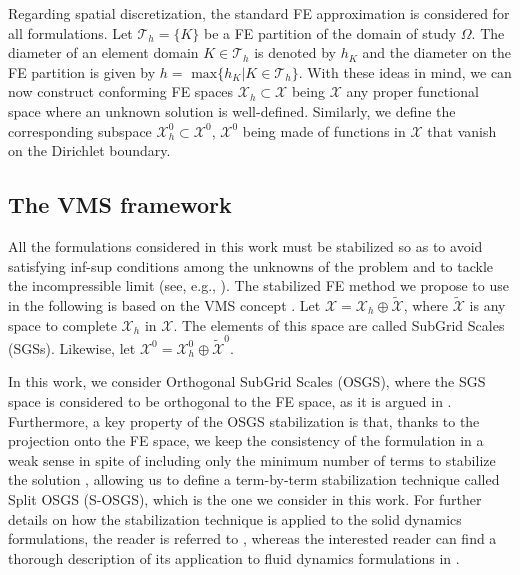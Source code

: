 \documentclass[11pt,english]{article}
\begin{document}
Regarding spatial discretization, the standard FE approximation is considered for all formulations. Let $\mathcal{T}_h = \{ K\}$ be a FE partition of the domain of study $\Omega$. The diameter of an element domain $K \in \mathcal{T}_h $ is denoted by $h_K$ and the diameter on the FE partition is given by $h=\text{ max} \lbrace h_K | K \in \mathcal{T}_h  \rbrace$. With these ideas in mind, we can now construct conforming FE spaces $\mathcal{X}_h \subset \mathcal{X}$ being $\mathcal{X}$ any proper functional space where an unknown solution is well-defined. Similarly, we define the corresponding subspace $\mathcal{X}^0_{h} \subset \mathcal{X}^0$, $\mathcal{X}^{0}$ being made of functions in $\mathcal{X}$ that vanish on the Dirichlet boundary.

\subsection{The VMS framework\label{subsec:preliminaries_VMS}}

All the formulations considered in this work must be stabilized so as to avoid satisfying inf-sup conditions among the unknowns of the problem and to tackle the incompressible limit (see, e.g., \cite{B-boffi-et-al}). The stabilized FE method we propose to use in the following is based on the VMS concept \cite{hughes1998variational,CodinaVMS}. Let $\mathcal{X}= \mathcal{X}_h \oplus  \tilde{\mathcal{X}}$, where $\tilde{\mathcal{X}}$ is any space to complete $\mathcal{X}_h$ in $\mathcal{X}$. The elements of this space are called SubGrid Scales (SGSs). Likewise, let $\mathcal{X}^0 = \mathcal{X}^0_{h} \oplus  \tilde{\mathcal{X}}^0$. 

In this work, we consider Orthogonal SubGrid Scales (OSGS), where the SGS space is considered to be orthogonal to the FE space, as it is argued in \cite{Codina2000}. Furthermore, a key property of the OSGS stabilization is that, thanks to the projection onto the FE space, we keep the consistency of the formulation in a weak sense in spite of including only the minimum number of terms to stabilize the solution \cite{Moreno2019,moreno2020solution}, allowing us to define a term-by-term stabilization technique called Split OSGS (S-OSGS), which is the one we consider in this work. For further details on how the stabilization technique is applied to the solid dynamics formulations, the reader is referred to \cite{CodinaCastanarBaiges2024}, whereas the interested reader can find a thorough description of its application to fluid dynamics formulations in \cite{CodinaVMS}.
\end{document}
